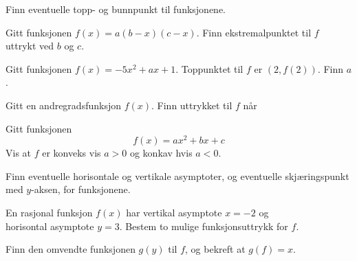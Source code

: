 





\opgt

\nes

Finn eventuelle topp- og bunnpunkt til funksjonene. \os
{}

Gitt funksjonen 
$ f(x)=a(b-x)(c-x) $. Finn ekstremalpunktet til $ f $ uttrykt ved $ b $ og $ c $. 

Gitt funksjonen $f(x)={-5x^2+ax+1}$. Toppunktet til $f$ er $(2, f(2))$. Finn $a$.

Gitt en andregradsfunksjon $ f(x) $. Finn uttrykket til $ f $ når
 \vs

Gitt funksjonen
\[ f(x)=ax^2+bx+c \]
Vis at $f$ er konveks vis $a>0$ og konkav hvis $a<0$.

\nes
{}
Finn eventuelle horisontale og vertikale asymptoter, og eventuelle skjæringspunkt med $ y $-aksen, for funksjonene. \os
{} \os
{}

En rasjonal funksjon $f(x)$ har vertikal asymptote $x=-2$ og \\horisontal asymptote $y=3$. \os
Bestem to mulige funksjonsuttrykk for $f$.


\nes
\newpage
{}
Finn den omvendte funksjonen $ g(y) $ til $ f $, og bekreft at $ g(f)=x $. \os
{} \os
{} \os
{}

